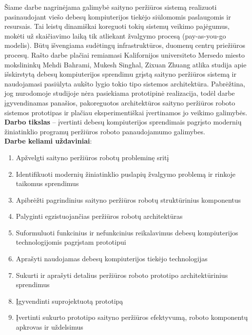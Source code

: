     Šiame darbe nagrinėjama galimybė saityno peržiūros sistemą realizuoti pasinaudojant viešo debesų kompiuterijos tiekėjo siūlomomis paslaugomis ir resursais. Tai leistų dinamiškai koreguoti tokių sistemų veikimo pajėgumus, mokėti už skaičiavimo laiką tik atliekant žvalgymo procesą (pay-as-you-go modelis). Būtų išvengiama sudėtingų infrastruktūros, duomenų centrų priežiūros procesų. Rašto darbe plačiai remiamasi Kalifornijos universiteto Mersedo miesto mokslininkų Mehdi Bahrami, Mukesh Singhal, Zixuan Zhuang atlika studija \cite{MercedCloudBasedWebCrawler} apie išskirstytą debesų kompiuterijos sprendimu grįstą saityno peržiūros sistemą ir naudojamasi pasiūlyta aukšto lygio tokio tipo sistemos architektūra. Pabrėžtina, jog nurodomoje studijoje nėra pasiekiama prototipinė realizacija, todėl darbe įgyvendinamas panašios, pakoreguotos architektūros saityno peržiūros roboto sistemos prototipas ir plačiau eksperimentiškai įvertinamos jo veikimo galimybės.
\\

\textbf{Darbo tikslas} -- įvertinti debesų kompiuterijos sprendimais pagrįsto modernių žiniatinklio programų peržiūros roboto panaudojamumo galimybes. 
\\

\textbf{Darbe keliami uždaviniai}:

\begin{enumerate}
    \item Apžvelgti saityno peržiūros robotų probleminę sritį
    \item Identifikuoti modernių žiniatinklio puslapių žvalgymo problemą ir rinkoje taikomus sprendimus
    \item Apibrėžti pagrindinius saityno peržiūros robotų struktūrinius komponentus
    \item Palyginti egzistuojančias peržiūros robotų architektūras
    \item Suformuluoti funkcinius ir nefunkcinius reikalavimus debesų kompiuterijos technologijomis pagrįstam prototipui
    \item Aprašyti naudojamas debesų kompiuterijos tiekėjo technologijas
    \item Sukurti ir aprašyti detalius peržiūros roboto prototipo architektūrinius sprendimus
    \item Įgyvendinti suprojektuotą prototipą
    \item Įvertinti sukurto prototipo saityno peržiūros efektyvumą, roboto komponentų apkrovas ir uždelsimus 
\end{enumerate}